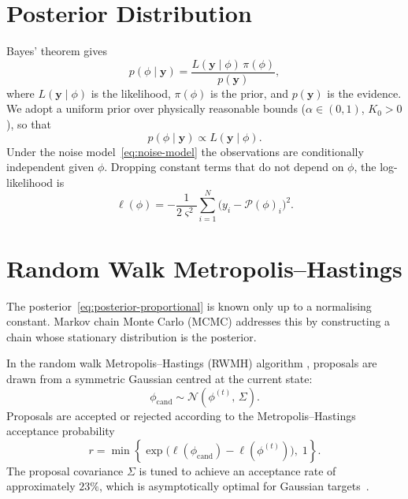 \section{Posterior Distribution}\label{sec:posterior}

Bayes' theorem gives
\begin{equation}
  p(\phi \mid \mathbf{y})
  = \frac{L(\mathbf{y} \mid \phi)\, \pi(\phi)}{p(\mathbf{y})},
  \label{eq:bayes}
\end{equation}
where $L(\mathbf{y} \mid \phi)$ is the likelihood,
$\pi(\phi)$ is the prior, and
$p(\mathbf{y})$ is the evidence. We adopt a uniform prior over
physically reasonable bounds ($\alpha \in (0,1)$, $K_0 > 0$), so that
\begin{equation}
  p(\phi \mid \mathbf{y}) \propto L(\mathbf{y} \mid \phi).
  \label{eq:posterior-proportional}
\end{equation}
Under the noise model~\cref{eq:noise-model} the observations are
conditionally independent given $\phi$. Dropping constant terms that do
not depend on $\phi$, the log-likelihood is
\begin{equation}
  \ell(\phi)
  = -\frac{1}{2\varsigma^2}
  \sum_{i=1}^{N}\big(y_i - \mathcal{P}(\phi)_i\big)^2.
  \label{eq:log-likelihood}
\end{equation}

\section{Random Walk Metropolis--Hastings}\label{sec:rwmh}

The posterior~\cref{eq:posterior-proportional} is known only up to a
normalising constant. Markov chain Monte Carlo (MCMC) addresses this by
constructing a chain whose stationary distribution is the posterior.

In the random walk Metropolis--Hastings (RWMH) algorithm
\cite{hastings1970monte,cabezas2024blackjax}, proposals are
drawn from a symmetric Gaussian centred at the current state:
\begin{equation}
  \phi_{\mathrm{cand}} \sim
  \mathcal{N}(\phi^{(t)},\, \Sigma).
  \label{eq:rwmh-proposal}
\end{equation}
Proposals are accepted or rejected according to the
Metropolis--Hastings acceptance probability~\cite{hastings1970monte}
\begin{equation}
  r = \min\!\left\{
    \exp\!\big(\ell(\phi_{\mathrm{cand}}) - \ell(\phi^{(t)})\big),\; 1
  \right\}.
  \label{eq:rwmh-acceptance}
\end{equation}
The proposal covariance $\Sigma$ is tuned to achieve an acceptance rate
of approximately $23\%$, which is asymptotically optimal for Gaussian
targets~\cite{gelman1997weak}.

